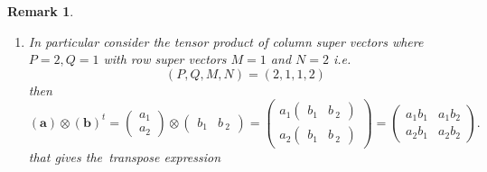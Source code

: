 \documentclass[aps,preprint]{revtex4}
\newtheorem{remark}[theorem]{Remark}
\begin{document}
\begin{remark}
\begin{enumerate}
\begin{enumerate}
\item In particular consider the tensor product of column super vectors
where $P=2,Q=1$ with row super vectors $M=1$ and $N=2$ i.e. 
\begin{equation}
\left( P,Q,M,N\right) =\left( 2,1,1,2\right)
\end{equation}%
then%
\begin{equation}
\left( \boldsymbol{a}\right) \otimes \left( \boldsymbol{b}\right)
^{t}=\left( 
\begin{array}{c}
a_{1} \\ 
a_{2}%
\end{array}%
\right) \otimes \left( 
\begin{array}{cc}
b_{1} & b_{\ 2}%
\end{array}%
\right) =\left( 
\begin{array}{c}
a_{1}\left( 
\begin{array}{cc}
b_{1} & b_{\ 2}%
\end{array}%
\right) \\ 
a_{2}\left( 
\begin{array}{cc}
b_{1} & b_{\ 2}%
\end{array}%
\right)%
\end{array}%
\right) =\left( 
\begin{array}{cc}
a_{1}b_{1} & a_{1}b_{2} \\ 
a_{2}b_{1} & a_{2}b_{2}%
\end{array}%
\right) .
\end{equation}%
that gives the\emph{\ transpose }expression


\end{enumerate}
\end{enumerate}
\end{remark}
\end{document}
